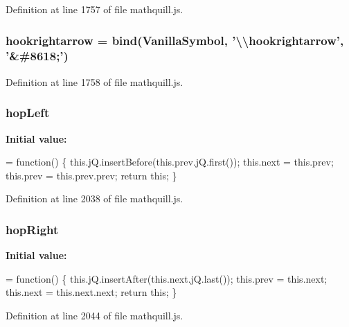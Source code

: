 Definition at line 1757 of file mathquill.\-js.

\subsubsection[{hookrightarrow}]{ hookrightarrow = {\bf bind}({\bf Vanilla\-Symbol}, '\textbackslash{}\textbackslash{}hookrightarrow', '\&\#8618;')}\label{mathquill_8js_ad33ca7a70dc5aa26de7dda9ff40f4ef9}


Definition at line 1758 of file mathquill.\-js.

\subsubsection[{hop\-Left}]{\setlength{\rightskip}{0pt plus 5cm}{\bf \-\_\-} hop\-Left}\label{mathquill_8js_acbb075d87020ce97df1fcd94349b59b5}
{\bfseries Initial value\-:}
\begin{DoxyCode}
= \textcolor{keyword}{function}() \{
  this.jQ.insertBefore(this.prev.jQ.first());
  this.next = this.prev;
  this.prev = this.prev.prev;
  \textcolor{keywordflow}{return} \textcolor{keyword}{this};
\}
\end{DoxyCode}


Definition at line 2038 of file mathquill.\-js.

\subsubsection[{hop\-Right}]{\setlength{\rightskip}{0pt plus 5cm}{\bf \-\_\-} hop\-Right}\label{mathquill_8js_a07c9746e3695d4174d38de9bcaf7e3c7}
{\bfseries Initial value\-:}
\begin{DoxyCode}
= \textcolor{keyword}{function}() \{
  this.jQ.insertAfter(this.next.jQ.last());
  this.prev = this.next;
  this.next = this.next.next;
  \textcolor{keywordflow}{return} \textcolor{keyword}{this};
\}
\end{DoxyCode}


Definition at line 2044 of file mathquill.\-js.

